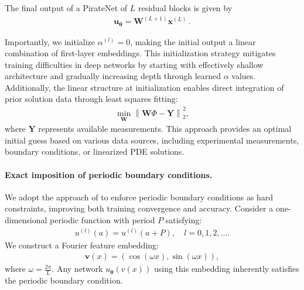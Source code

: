 The final output of a PirateNet of $L$ residual blocks is given by
\begin{align}
    \mathbf{u}_{\mathbf{\theta}} = \mathbf{W}^{(L+1)} \mathbf{x}^{(L)}\,.
\end{align}

Importantly, we initialize $\alpha^{(l)}=0$, making the initial output a linear combination of first-layer embeddings. This initialization strategy mitigates training difficulties in deep networks by starting with effectively shallow architecture and gradually increasing depth through learned $\alpha$ values. Additionally, the linear structure at initialization enables direct integration of prior solution data through least squares fitting:
\begin{align}
\label{eq: lq}
\min_{\mathbf{W}} \left\| \mathbf{W} \Phi  - \mathbf{Y} \right\|_2^2,
\end{align}
where $\mathbf{Y}$ represents available measurements. This approach provides an optimal initial guess based on various data sources, including experimental measurements, boundary conditions, or linearized PDE solutions.

\paragraph{Exact imposition of periodic boundary conditions.} We adopt the approach of \cite{dong2021method} to enforce periodic boundary conditions as hard constraints, improving both training convergence and accuracy. Consider a one-dimensional periodic function with period $P$ satisfying:
\begin{align}\label{eq:periodic_constraint}
    u^{(l)}(a) = u^{(l)}(a + P), \quad l=0, 1, 2, \dots.
\end{align}
We construct a Fourier feature embedding:
\begin{align}
    \label{eq: 1D_Fourier}
    \mathbf{v}(x) = \left(\cos (\omega x), \sin (\omega x) \right),
\end{align}
where $\omega = \frac{2 \pi}{L}$. Any network $u_{\mathbf{\theta}}(v(x))$ using this embedding inherently satisfies the periodic boundary condition.

